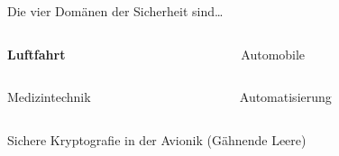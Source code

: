 
\begin{frame}{Die vier Domänen der Sicherheit sind…}
  \Large
  \begin{columns}[c]
    \begin{column}{.5\linewidth}
      \textbf{Luftfahrt}
    \end{column}
    \begin{column}{.5\linewidth}
      Automobile
    \end{column}
  \end{columns}
  \vfill
  \begin{columns}[c]
    \begin{column}{.5\linewidth}
      Medizintechnik
    \end{column}
    \begin{column}{.5\linewidth}
      Automatisierung
    \end{column}
  \end{columns}
\end{frame}


\begin{frame}[c]{Sichere Kryptografie in der Avionik}
  \vspace{4em}
  \footnotesize
  (Gähnende Leere)
\end{frame}

